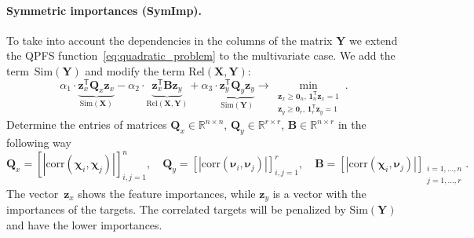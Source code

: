 \documentclass[12pt,twoside]{article}
\theoremstyle{definition}
\newcommand{\bz}{\mathbf{z}}
\newcommand{\bY}{\mathbf{Y}}
\newcommand{\bX}{\mathbf{X}}
\newcommand{\bB}{\mathbf{B}}
\newcommand{\bQ}{\mathbf{Q}}
\newcommand{\bbR}{\mathbb{R}}
\newcommand{\T}{\mathsf{T}}
\newcommand{\bchi}{\boldsymbol{\chi}}
\newcommand{\bnu}{\boldsymbol{\nu}}
\newcommand{\bOne}{\boldsymbol{1}}
\newcommand{\bZero}{\boldsymbol{0}}
\begin{document}
\paragraph{Symmetric importances (SymImp).}

To take into account the dependencies in the columns of the matrix $\bY$ we extend the QPFS function~\eqref{eq:quadratic_problem} to the multivariate case.
We add the term~$\text{Sim}(\bY)$ and modify the term $\text{Rel}(\bX, \bY)$:
\begin{equation}
	\alpha_1 \cdot \underbrace{\bz_x^{\T} \bQ_x \bz_x}_{\text{Sim}(\bX)} - \alpha_2 \cdot \underbrace{\bz_x^{\T} \bB \bz_y}_{\text{Rel}(\bX, \bY)} + \alpha_3 \cdot \underbrace{\bz_y^{\T} \bQ_y \bz_y}_{\text{Sim}(\bY)} \rightarrow \min_{\substack{\bz_x \geq \bZero_n, \, \bOne_n^{\T}\bz_x=1 \\ \bz_y \geq \bZero_r, \, \bOne_r^{\T}\bz_y=1}}.
	\label{eq:multivariate_quadratic_problem}
\end{equation}
Determine the entries of matrices $\bQ_x \in \bbR^{n \times n}$, $\bQ_y \in \bbR^{r \times r}$, $\bB \in \bbR^{n \times r}$ in the following way
\begin{equation*}
	\bQ_x = \left[ \left| \text{corr}(\bchi_i, \bchi_j) \right| \right]_{i,j=1}^n, \quad
	\bQ_y = \left[ \left| \text{corr}(\bnu_i, \bnu_j) \right| \right]_{i,j=1}^r, \quad
	\bB =  \left[ \left| \text{corr}(\bchi_i, \bnu_j) \right| \right]_{\substack{i=1, \dots, n \\ j=1, \dots, r}}.
\end{equation*}
The vector~$\bz_x$ shows the feature importances, while $\bz_y$ is a vector with the importances of the targets.
The correlated targets will be penalized by $\text{Sim} (\bY)$ and have the lower importances.
\end{document}
